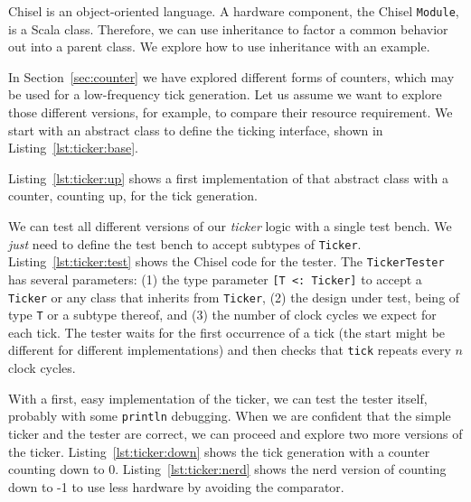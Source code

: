 \documentclass[%
    10pt,
    headinclude, footexclude,
    openright, %
    notitlepage,
    cleardoubleempty,
    headsepline,
    pointlessnumbers,
    bibtotoc, idxtotoc,
    ]{scrbook}
\newcommand{\code}[1]{{\small{\texttt{#1}}}}
\begin{document}
Chisel is an object-oriented language. A hardware component, the Chisel \code{Module},
is a Scala class. Therefore, we can use inheritance to factor a common behavior
out into a parent class. We explore how to use inheritance with an example.

In Section~\ref{sec:counter} we have explored different forms of counters,
which may be used for a low-frequency tick generation. Let us assume we want to
explore those different versions, for example, to compare their resource requirement.
We start with an abstract class to define the ticking interface, shown in Listing~\ref{lst:ticker:base}.


\noindent Listing~\ref{lst:ticker:up} shows a first implementation of that abstract class
with a counter, counting up, for the tick generation.


We can test all different versions of our \emph{ticker} logic with a single test bench.
We \emph{just} need to define the test bench to accept subtypes of \code{Ticker}.
Listing~\ref{lst:ticker:test} shows the Chisel code for the tester.
The \code{TickerTester} has several parameters: (1) the type parameter
\code{[T <: Ticker]} to accept a \code{Ticker} or any class that inherits from \code{Ticker},
(2) the design under test, being of type \code{T} or a subtype thereof,
and (3) the number of clock cycles we expect for each tick.
The tester waits for the first occurrence of a tick (the start might be different for
different implementations) and then checks that \code{tick} repeats every $n$ clock cycles.


With a first, easy implementation of the ticker, we can test the tester
itself, probably with some \code{println} debugging. When we are confident that
the simple ticker and the tester are correct, we can proceed and explore
two more versions of the ticker. Listing~\ref{lst:ticker:down} shows the tick
generation with a counter counting down to 0.
Listing~\ref{lst:ticker:nerd} shows the nerd version of counting down to -1 to use
less hardware by avoiding the comparator.

\end{document}
